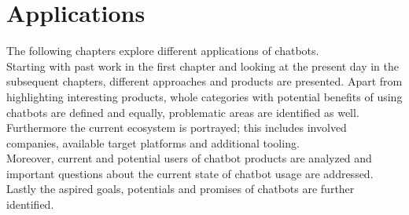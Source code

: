 \chapter{Applications}


The following chapters explore different applications of chatbots.
\\
Starting with past work in the first chapter and looking at the present day in the subsequent chapters,
different approaches and products are presented.  Apart from highlighting interesting products, whole categories with potential benefits of using chatbots are defined and equally, problematic areas are identified as well.
\\
Furthermore the current ecosystem is portrayed; this includes involved companies, available target platforms and additional tooling.
\\
Moreover, current and potential users of chatbot products are analyzed and important questions about the current state of chatbot usage are addressed.
\\
Lastly the aspired goals, potentials and promises of chatbots are further identified.

